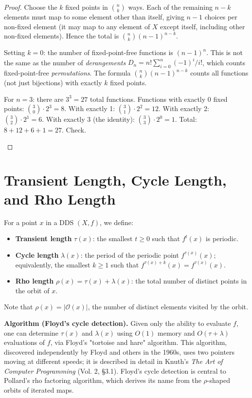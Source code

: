 \begin{proof}
Choose the $k$ fixed points in $\binom{n}{k}$ ways. Each of the remaining $n - k$ elements must map to some element other than itself, giving $n - 1$ choices per non-fixed element (it may map to any element of $X$ except itself, including other non-fixed elements). Hence the total is $\binom{n}{k}(n-1)^{n-k}$. 

\begin{remark}
Setting $k = 0$: the number of fixed-point-free functions is $(n-1)^n$. This is not the same as the number of \textit{derangements} $D_n = n!\sum_{i=0}^{n}(-1)^i/i!$, which counts fixed-point-free \textit{permutations}. The formula $\binom{n}{k}(n-1)^{n-k}$ counts all functions (not just bijections) with exactly $k$ fixed points.
\end{remark}

\begin{example}
For $n = 3$: there are $3^3 = 27$ total functions. Functions with exactly 0 fixed points: $\binom{3}{0} \cdot 2^3 = 8$. With exactly 1: $\binom{3}{1} \cdot 2^2 = 12$. With exactly 2: $\binom{3}{2} \cdot 2^1 = 6$. With exactly 3 (the identity): $\binom{3}{3} \cdot 2^0 = 1$. Total: $8 + 12 + 6 + 1 = 27$. Check.
\end{example}

\end{proof}

\section{Transient Length, Cycle Length, and Rho Length}

For a point $x$ in a DDS $(X, f)$, we define:

\begin{itemize}
\item \textbf{Transient length} $\tau(x)$: the smallest $t \geq 0$ such that $f^t(x)$ is periodic.
\item \textbf{Cycle length} $\lambda(x)$: the period of the periodic point $f^{\tau(x)}(x)$; equivalently, the smallest $k \geq 1$ such that $f^{\tau(x)+k}(x) = f^{\tau(x)}(x)$.
\item \textbf{Rho length} $\rho(x) = \tau(x) + \lambda(x)$: the total number of distinct points in the orbit of $x$.
\end{itemize}

Note that $\rho(x) = |\mathcal{O}(x)|$, the number of distinct elements visited by the orbit.

\textbf{Algorithm (Floyd's cycle detection).} Given only the ability to evaluate $f$, one can determine $\tau(x)$ and $\lambda(x)$ using $O(1)$ memory and $O(\tau + \lambda)$ evaluations of $f$, via Floyd's "tortoise and hare" algorithm. This algorithm, discovered independently by Floyd and others in the 1960s, uses two pointers moving at different speeds; it is described in detail in Knuth's \textit{The Art of Computer Programming} (Vol. 2, §3.1). Floyd's cycle detection is central to Pollard's rho factoring algorithm, which derives its name from the $\rho$-shaped orbits of iterated maps.

